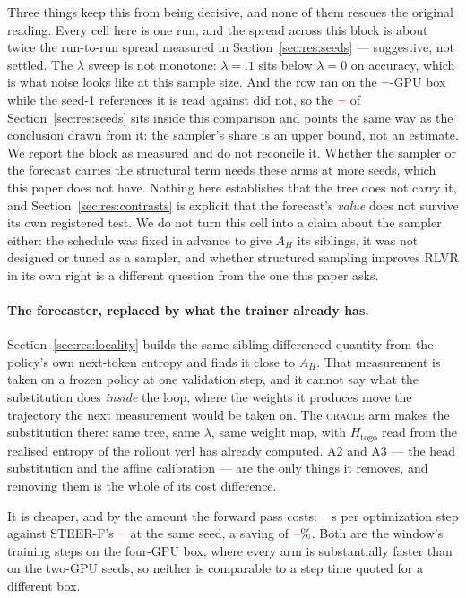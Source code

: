 \documentclass[11pt]{article}
\newcommand{\Htogo}{H_{\mathrm{togo}}}
\newcommand{\AH}{A_{H}}
\providecommand{\PENDING}{\textcolor{red}{\textbf{--}}}
\newcommand{\num}[1]{\ifcsname #1\endcsname\csname #1\endcsname\else\PENDING\fi}
\begin{document}
Three things keep this from being decisive, and none of them rescues the original
reading. Every cell here is one run, and the spread across this block is about twice
the run-to-run spread measured in Section~\ref{sec:res:seeds} --- suggestive, not
settled. The $\lambda$ sweep is not monotone: $\lambda = .1$ sits below
$\lambda = 0$ on accuracy, which is what noise looks like at this sample size. And
the row ran on the $\num{Rlamzerogpus}$-GPU box while the seed-1 references it is
read against did not, so the $\num{Boxdelta}$ of Section~\ref{sec:res:seeds} sits
inside this comparison and points the same way as the conclusion drawn from it: the
sampler's share is an upper bound, not an estimate. We
report the block as measured and do not reconcile it. Whether the sampler or the
forecast carries the structural term needs these arms at more seeds, which this
paper does not have. Nothing here establishes that the tree does not carry it, and
Section~\ref{sec:res:contrasts} is explicit that the forecast's \emph{value} does
not survive its own registered test. We do not turn this cell into a claim about the
sampler either: the schedule was fixed in advance to give $\AH$ its siblings, it was
not designed or tuned as a sampler, and whether structured sampling improves RLVR
in its own right is a different question from the one this paper asks.

\paragraph{The forecaster, replaced by what the trainer already has.}
Section~\ref{sec:res:locality} builds the same sibling-differenced quantity from the
policy's own next-token entropy and finds it close to $\AH$. That measurement is
taken on a frozen policy at one validation step, and it cannot say what the
substitution does \emph{inside} the loop, where the weights it produces move the
trajectory the next measurement would be taken on. The \textsc{oracle} arm makes the
substitution there: same tree, same $\lambda$, same weight map, with $\Htogo$ read
from the realised entropy of the rollout verl has already computed. A2 and A3 ---
the head substitution and the affine calibration --- are the only things it removes,
and removing them is the whole of its cost difference.

It is cheaper, and by the amount the forward pass costs: $\num{Roraclecost}$\,s per
optimization step against STEER-F's $\num{Fsignedoracleref}$ at the same seed, a
saving of $\num{Fsignedoraclesaving}\%$. Both are the window's training steps on the
four-GPU box, where every arm is substantially faster than on the two-GPU seeds, so
neither is comparable to a step time quoted for a different box.
\end{document}
